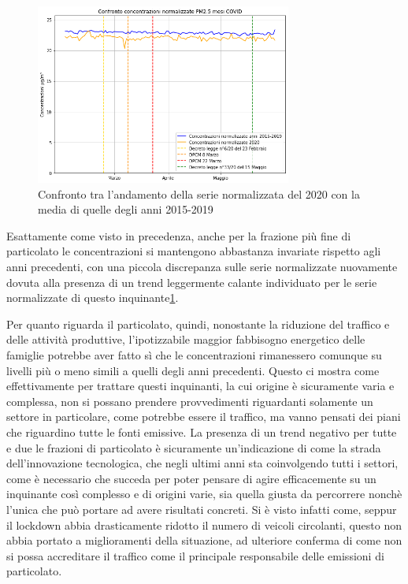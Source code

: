 \documentclass[a4paper]{report}
\begin{document}
\begin{figure}[h]
\centering
\includegraphics[width=0.75\textwidth]{pm25_covid_norm}
\caption{Confronto tra l'andamento della serie normalizzata del 2020 con la media di quelle degli anni 2015-2019}
\label{fig:pm25_covid_norm}
\end{figure}

Esattamente come visto in precedenza, anche per la frazione più fine di particolato le concentrazioni si mantengono abbastanza invariate rispetto agli anni precedenti, con una piccola discrepanza sulle serie normalizzate nuovamente dovuta alla presenza di un trend leggermente calante individuato per le serie normalizzate di questo inquinante\ref{fig:pm25_covid_norm}.

Per quanto riguarda il particolato, quindi, nonostante la riduzione del traffico e delle attività produttive, l'ipotizzabile maggior fabbisogno energetico
 delle famiglie potrebbe aver fatto sì che le concentrazioni rimanessero comunque su livelli più o meno simili a quelli degli anni precedenti.
Questo ci mostra come effettivamente per trattare questi inquinanti, la cui origine è sicuramente varia e complessa, non si possano prendere provvedimenti riguardanti solamente un settore in particolare, come potrebbe essere il traffico, ma vanno pensati dei piani che riguardino tutte le fonti emissive.
La presenza di un trend negativo per tutte e due le frazioni di particolato è sicuramente un'indicazione di come la strada dell'innovazione tecnologica, che negli ultimi anni sta coinvolgendo tutti i settori, come è necessario che succeda per poter pensare di agire efficacemente su un inquinante così complesso e di origini varie, sia quella giusta da percorrere nonchè l'unica che può portare ad avere risultati concreti. Si è visto infatti come, seppur il lockdown abbia drasticamente ridotto il numero di veicoli circolanti, questo non abbia portato a miglioramenti della situazione, ad ulteriore conferma di come non si possa accreditare il traffico come il principale responsabile delle emissioni di particolato.
\end{document}
